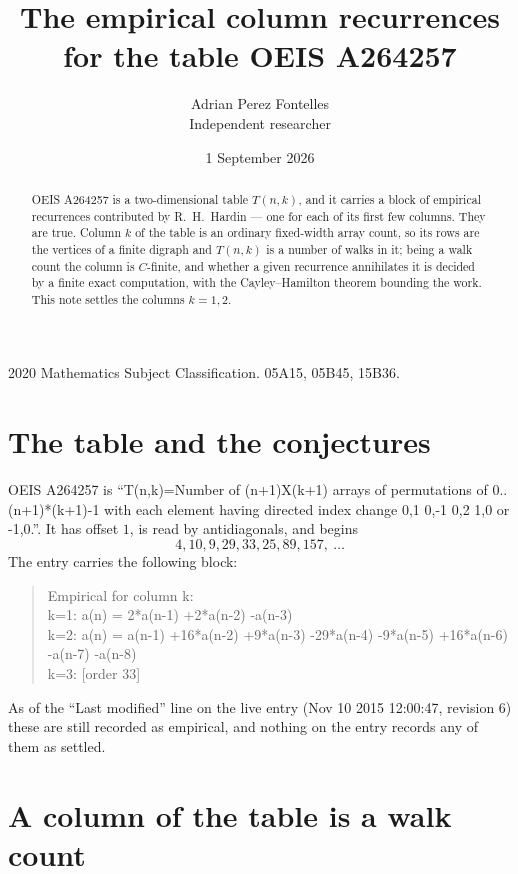 \documentclass[11pt,a4paper]{article}
\title{The empirical column recurrences for the table OEIS A264257}
\author{Adrian Perez Fontelles\\ \small Independent researcher}
\date{1 September 2026}
\theoremstyle{plain}
\theoremstyle{definition}
\begin{document}
\maketitle

\begin{abstract}
OEIS A264257 is a two-dimensional table $T(n,k)$, and it carries a block of empirical
recurrences contributed by R.~H.~Hardin --- one for each of its first few columns. They are
true. Column $k$ of the table is an ordinary fixed-width array count, so its rows are the
vertices of a finite digraph and $T(n,k)$ is a number of walks in it; being a walk count the
column is $C$-finite, and whether a given recurrence annihilates it is decided by a finite
exact computation, with the Cayley--Hamilton theorem bounding the work. This note settles the columns $k=1, 2$.
\end{abstract}

\noindent\small 2020 Mathematics Subject Classification. 05A15, 05B45, 15B36.\normalsize

\section{The table and the conjectures}

OEIS A264257 is ``T(n,k)=Number of (n+1)X(k+1) arrays of permutations of 0..(n+1)*(k+1)-1 with each element having directed index change 0,1 0,-1 0,2 1,0 or -1,0.''. It has offset $1$, is
read by antidiagonals, and begins
\[
4, 10, 9, 29, 33, 25, 89, 157,\ \dots
\]
The entry carries the following block:
\begin{quote}\small
Empirical for column k:\\
k=1: a(n) = 2*a(n-1) +2*a(n-2) -a(n-3)\\
k=2: a(n) = a(n-1) +16*a(n-2) +9*a(n-3) -29*a(n-4) -9*a(n-5) +16*a(n-6) -a(n-7) -a(n-8)\\
k=3: [order 33]\\
\end{quote}
As of the ``Last modified'' line on the live entry (Nov 10 2015 12:00:47, revision 6) these are still
recorded as empirical, and nothing on the entry records any of them as settled.

\section{A column of the table is a walk count}
\end{document}
